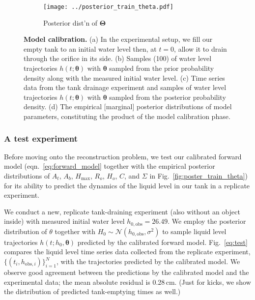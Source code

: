 \documentclass[openacc]{rsproca_new}%
\newcommand\thedata {$\{(t_i,h_{\text{obs}, i})\}_{i=1}^{N}$\xspace}
\begin{document}
\begin{figure}[h!]
     \begin{subfigure}[b]{0.85\textwidth}
    	\texttt{[image: ../posterior\_train\_theta.pdf]}
	\caption{Posterior dist'n of $\boldsymbol \Theta$} \label{fig:posterior_train_theta}
    \end{subfigure}
    
    \caption{
      \textbf{Model calibration.}
      (a) In the experimental setup, we fill our empty tank to an initial water level then, at $t=0$, allow it to drain through the orifice in its side.
      (b) Samples (100) of water level trajectories $h(t; \boldsymbol \theta)$ with $\boldsymbol \theta$ sampled from the prior probability density along with the measured initial water level.
      (c) Time series data from the tank drainage experiment and samples of water level trajectories $h(t; \boldsymbol \theta)$ with $\boldsymbol \theta$ sampled from the posterior probability density.
      (d) The empirical [marginal] posterior distributions of model parameters, constituting the product of the model calibration phase.
      }
\end{figure}

\subsubsection{A test experiment}
Before moving onto the reconstruction problem, we test our calibrated forward model (eqn.~\ref{eq:forward_model} together with the empirical posterior distributions of $A_t$, $A_b$, $H_{\text{max}}$, $R_o$, $H_o$, $C$, and $\Sigma$ in Fig.~\ref{fig:poster_train_theta}) for its ability to predict the dynamics of the liquid level in our tank in a replicate experiment.

We conduct a new, replicate tank-draining experiment (also without an object inside) with measured initial water level $h_{0, \text{obs}}=26.49$. 
We employ the posterior distribution of $\theta$ together with $H_0\sim \mathcal{N}(h_{0, \text{obs}}, \sigma^2)$ to sample liquid level trajectories $h(t; h_0, \boldsymbol \theta)$ predicted by the calibrated forward model. 
Fig.~\ref{eq:test} compares the liquid level time series data collected from the replicate experiment, \thedata, with the trajectories predicted by the calibrated model. We observe good agreement between the predictions by the calibrated model and the experimental data; the mean absolute residual is 0.28\,cm. (Just for kicks, we show the distribution of predicted tank-emptying times as well.)
\end{document}
